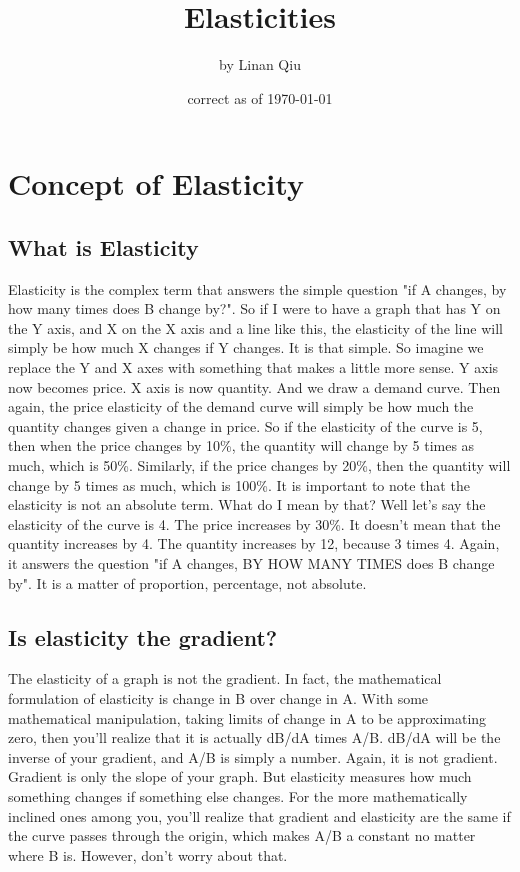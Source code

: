 \RequirePackage{../../dominatrix}

\title{Elasticities}
\author{\large by Linan Qiu}
\date{\small correct as of \today}

\maketitle
\tableofcontents
\section{Concept of Elasticity}
\subsection{What is Elasticity}
Elasticity is the complex term that answers the simple question "if A changes, by how many times does B change by?". So if I were to have a graph that has Y on the Y axis, and X on the X axis and a line like this, the elasticity of the line will simply be how much X changes if Y changes. It is that simple. So imagine we replace the Y and X axes with something that makes a little more sense. Y axis now becomes price. X axis is now quantity. And we draw a demand curve. Then again, the price elasticity of the demand curve will simply be how much the quantity changes given a change in price. So if the elasticity of the curve is 5, then when the price changes by 10\%, the quantity will change by 5 times as much, which is 50\%. Similarly, if the price changes by 20\%, then the quantity will change by 5 times as much, which is 100\%. It is important to note that the elasticity is not an absolute term. What do I mean by that? Well let's say the elasticity of the curve is 4. The price increases by 30\%. It doesn't mean that the quantity increases by 4. The quantity increases by 12, because 3 times 4. Again, it answers the question "if A changes, BY HOW MANY TIMES does B change by". It is a matter of proportion, percentage, not absolute. 
\subsection{Is elasticity the gradient?}
The elasticity of a graph is not the gradient. In fact, the mathematical formulation of elasticity is change in B over change in A. With some mathematical manipulation, taking limits of change in A to be approximating zero, then you'll realize that it is actually dB/dA times A/B. dB/dA will be the inverse of your gradient, and A/B is simply a number. Again, it is not gradient. Gradient is only the slope of your graph. But elasticity measures how much something changes if something else changes. For the more mathematically inclined ones among you, you'll realize that gradient and elasticity are the same if the curve passes through the origin, which makes A/B a constant no matter where B is. However, don't worry about that.
